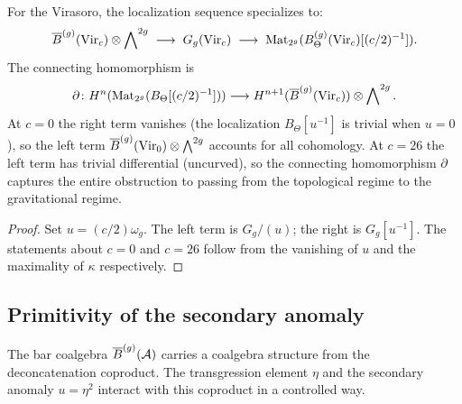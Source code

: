 \begin{corollary}
For the Virasoro, the localization sequence specializes to:
\begin{equation}%
\barB^{(g)}(\mathrm{Vir}_c) \otimes \bigwedge\nolimits^{2g}
\;\longrightarrow\;
G_g(\mathrm{Vir}_c)
\;\longrightarrow\;
\mathrm{Mat}_{2^g}(B_\Theta^{(g)}(\mathrm{Vir}_c)[(c/2)^{-1}]).
\end{equation}
The connecting homomorphism is
\begin{equation}%
\partial\colon
H^n(\mathrm{Mat}_{2^g}(B_\Theta[(c/2)^{-1}]))
\longrightarrow
H^{n+1}(\barB^{(g)}(\mathrm{Vir}_c))
\otimes \bigwedge\nolimits^{2g}.
\end{equation}
At $c = 0$ the right term vanishes (the localization
$B_\Theta[u^{-1}]$ is trivial when $u = 0$), so the left term
$\overline{B}^{(g)}(\mathrm{Vir}_0) \otimes \bigwedge^{2g}$ accounts for all
cohomology. At $c = 26$ the left term has trivial
differential (uncurved), so the connecting homomorphism
$\partial$ captures the entire obstruction to passing from the
topological regime to the gravitational regime.
\end{corollary}

\begin{proof}
Set $u = (c/2)\omega_g$. The left term is $G_g/(u)$; the right is
$G_g[u^{-1}]$. The statements about $c = 0$ and $c = 26$ follow from
the vanishing of $u$ and the maximality of $\kappa$ respectively.
\end{proof}

%
%

\subsection{Primitivity of the secondary anomaly}

The bar coalgebra $\overline{B}^{(g)}(\mathcal{A})$ carries a coalgebra structure
from the deconcatenation coproduct. The transgression element $\eta$
and the secondary anomaly $u = \eta^2$ interact with this coproduct in
a controlled way.

